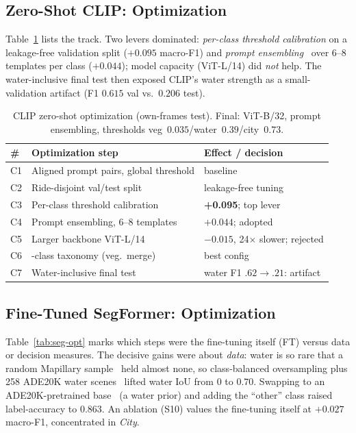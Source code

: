 \documentclass[letterpaper,journal]{IEEEtran}
\begin{document}
\subsection{Zero-Shot CLIP: Optimization}
Table~\ref{tab:clip-opt} lists the track. Two levers dominated: \emph{per-class
threshold calibration} on a leakage-free validation split ($+0.095$ macro-F1) and
\emph{prompt ensembling}~\cite{clip} over 6--8 templates per class ($+0.044$); model
capacity (ViT-L/14) did \emph{not} help. The water-inclusive final test then exposed
CLIP's water strength as a small-validation artifact (F1 $0.615$ val vs.\ $0.206$
test).

\begin{table}[!t]
\caption{CLIP zero-shot optimization (own-frames test). Final: ViT-B/32, prompt
ensembling, thresholds veg~$0.035$/water~$0.39$/city~$0.73$.}
\label{tab:clip-opt}
\centering
\scriptsize
\setlength{\tabcolsep}{2pt}
\renewcommand{\arraystretch}{1.0}
\begin{tabular}{@{}p{}>{\raggedright\arraybackslash}p{}>{\raggedright\arraybackslash}p{}@{}}
\toprule
\textbf{\#} & \textbf{Optimization step} & \textbf{Effect / decision}\\
\midrule
C1 & Aligned prompt pairs, global threshold & baseline\\
C2 & Ride-disjoint val/test split & leakage-free tuning\\
C3 & Per-class threshold calibration & \textbf{+0.095}; top lever\\
C4 & Prompt ensembling, 6--8 templates~\cite{clip} & $+0.044$; adopted\\
C5 & Larger backbone ViT-L/14 & $-0.015$, 24$\times$ slower; rejected\\
C6 & 3-class taxonomy (veg.\ merge) & best config\\
C7 & Water-inclusive final test & water F1 $.62{\to}.21$: artifact\\
\bottomrule
\end{tabular}
\end{table}

\subsection{Fine-Tuned SegFormer: Optimization}
Table~\ref{tab:seg-opt} marks which steps were the fine-tuning itself (FT) versus
data or decision measures. The decisive gains were about \emph{data}: water is so
rare that a random Mapillary sample~\cite{mapillaryvistas} held almost none, so
class-balanced oversampling plus 258 ADE20K water scenes~\cite{ade20k} lifted water
IoU from $0$ to $0.70$. Swapping to an ADE20K-pretrained
base~\cite{ade20k,ftsegformer} (a water prior) and adding the ``other'' class raised
label-accuracy to $0.863$. An ablation (S10) values the fine-tuning itself at
$+0.027$ macro-F1, concentrated in \emph{City}.
\end{document}

